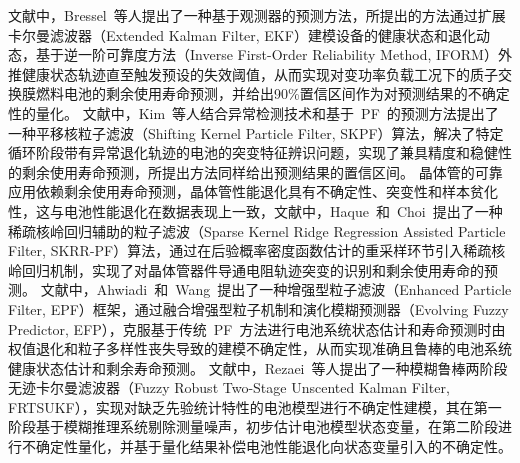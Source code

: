 文献\cite{7386653}中，Bressel~等人提出了一种基于观测器的预测方法，所提出的方法通过扩展卡尔曼滤波器（Extended Kalman Filter, EKF）建模设备的健康状态和退化动态，基于逆一阶可靠度方法（Inverse First-Order Reliability Method, IFORM）外推健康状态轨迹直至触发预设的失效阈值，从而实现对变功率负载工况下的质子交换膜燃料电池的剩余使用寿命预测，并给出90\%置信区间作为对预测结果的不确定性的量化。
文献\cite{9032349}中，Kim~等人结合异常检测技术和基于~PF~的预测方法提出了一种平移核粒子滤波（Shifting Kernel Particle Filter, SKPF）算法，解决了特定循环阶段带有异常退化轨迹的电池的突变特征辨识问题，实现了兼具精度和稳健性的剩余使用寿命预测，所提出方法同样给出预测结果的置信区间。
晶体管的可靠应用依赖剩余使用寿命预测，晶体管性能退化具有不确定性、突变性和样本贫化性，这与电池性能退化在数据表现上一致，文献\cite{9113648}中，Haque~和~Choi~提出了一种稀疏核岭回归辅助的粒子滤波（Sparse Kernel Ridge Regression Assisted Particle Filter, SKRR-PF）算法，通过在后验概率密度函数估计的重采样环节引入稀疏核岭回归机制，实现了对晶体管器件导通电阻轨迹突变的识别和剩余使用寿命的预测。
文献\cite{AHWIADI2022110817}中，Ahwiadi~和~Wang~提出了一种增强型粒子滤波（Enhanced Particle Filter, EPF）框架，通过融合增强型粒子机制和演化模糊预测器（Evolving Fuzzy Predictor, EFP），克服基于传统~PF~方法进行电池系统状态估计和寿命预测时由权值退化和粒子多样性丧失导致的建模不确定性，从而实现准确且鲁棒的电池系统健康状态估计和剩余寿命预测。
文献\cite{REZAEI2023107883}中，Rezaei~等人提出了一种模糊鲁棒两阶段无迹卡尔曼滤波器（Fuzzy Robust Two-Stage Unscented Kalman Filter, FRTSUKF），实现对缺乏先验统计特性的电池模型进行不确定性建模，其在第一阶段基于模糊推理系统剔除测量噪声，初步估计电池模型状态变量，在第二阶段进行不确定性量化，并基于量化结果补偿电池性能退化向状态变量引入的不确定性。
